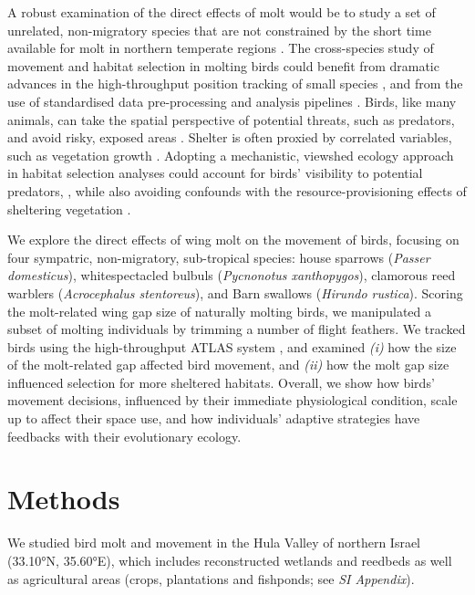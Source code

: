 \begin{refsection}
A robust examination of the direct effects of molt would be to study a set of unrelated, non-migratory species that are not constrained by the short time available for molt in northern temperate regions \cite{ginn1983,jenni2020}.
The cross-species study of movement and habitat selection in molting birds could benefit from dramatic advances in the high-throughput position tracking of small species \cite{toledo2020,nathan2022}, and from the use of standardised data pre-processing and analysis pipelines \cite{gupte2022d}.
Birds, like many animals, can take the spatial perspective of potential threats, such as predators, and avoid risky, exposed areas \cite{hampton1994,emery2000,krams2001,davidson2016,krams2020}.
Shelter is often proxied by correlated variables, such as vegetation growth \cite{pettorelli2011}. Adopting a mechanistic, viewshed ecology approach \cite{olsoy2015,aben2018,aben2021} in habitat selection analyses could account for birds' visibility to potential predators, \cite{olsoy2015,aben2018,aben2021}, while also avoiding confounds with the resource-provisioning effects of sheltering vegetation \citep{pettorelli2011}.

We explore the direct effects of wing molt on the movement of birds, focusing on four sympatric, non-migratory, sub-tropical species: house sparrows (\textit{Passer domesticus}), whitespectacled bulbuls (\textit{Pycnonotus xanthopygos}), clamorous reed warblers (\textit{Acrocephalus stentoreus}), and Barn swallows (\textit{Hirundo rustica}).
Scoring the molt-related wing gap size \citep{lind2001,kiat2016} of naturally molting birds, we manipulated a subset of molting individuals by trimming a number of flight feathers.
We tracked birds using the high-throughput ATLAS system \citep{toledo2014,weiser2016,toledo2020}, and examined \textit{(i)} how the size of the molt-related gap affected bird movement, and \textit{(ii)} how the molt gap size influenced selection for more sheltered habitats.
Overall, we show how birds' movement decisions, influenced by their immediate physiological condition, scale up to affect their space use, and how individuals' adaptive strategies have feedbacks with their evolutionary ecology.

\section*{Methods}

We studied bird molt and movement in the Hula Valley of northern Israel (33.10°N, 35.60°E), which includes reconstructed wetlands and reedbeds as well as agricultural areas (crops, plantations and fishponds; see \textit{SI Appendix}).


\end{refsection}
